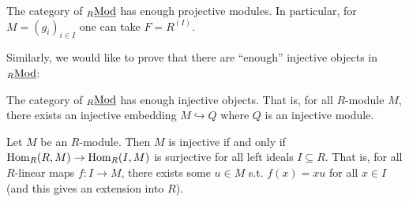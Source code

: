 \begin{corollary}
    The category of ${}_{R}\underline{\textup{Mod}}$ has enough projective modules. In particular, for $M = (g_i)_{i\in I}$ one can take $F = R^{(I)}$. 
\end{corollary}

Similarly, we would like to prove that there are ``enough'' injective objects in ${}_{R}\underline{\textup{Mod}}$:

\begin{theorem}\label{thm:enough injectives}
    The category of ${}_{R}\underline{\textup{Mod}}$ has enough injective objects. That is, for all $R$-module $M$, there exists an injective embedding $M \hookrightarrow Q$ where $Q$ is an injective module.
\end{theorem}

\begin{proposition}[Baer]\label{prop:Baer}
    Let $M$ be an $R$-module. Then $M$ is injective if and only if $\mathrm{Hom}_R(R, M) \to \mathrm{Hom}_R(I, M)$ is surjective for all left ideals $I \subseteq R$. That is, for all $R$-linear maps $f: I \to M$, there exists some $u\in M$ s.t. $f(x) = xu$ for all $x\in I$ (and this gives an extension into $R$).
\end{proposition}

